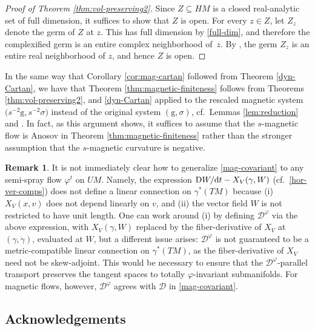 \documentclass[pdftex]{sigma}
\newcommand{\g}{\mathrm{g}}
\numberwithin{equation}{section}
\theoremstyle{definition}
\newtheorem{rem}[Theorem]{Remark}
\begin{document}
\begin{proof}[Proof of Theorem \ref{thm:vol-preserving2}]
Since $Z \subseteq HM$ is a closed real-analytic set of full dimension, it suffices to show that $Z$ is open. For every $z \in Z$, let $Z_z$ denote the germ of $Z$ at $z$. This has full dimension by \eqref{full-dim}, and therefore the complexified germ is an entire complex neighborhood of~$z$. By \cite[Chapter V, Proposition 1]{narasimhan2006introduction}, the germ $Z_z$ is an entire real neighborhood of $z$, and hence $Z$ is open.
\end{proof}

In the same way that Corollary \ref{cor:mag-cartan} followed from Theorem \ref{dyn-Cartan}, we have that Theorem \ref{thm:magnetic-finiteness} follows from Theorems \ref{thm:vol-preserving2}, and \ref{dyn-Cartan} applied to the rescaled magnetic system $\bigl(s^{-2}\g,s^{-2}\sigma\bigr)$ instead of the original system $(\g,\sigma)$, cf.\ Lemmas \ref{lem:reduction} and \cite{Paternains-94-convex}. In fact, as this argument shows, it suffices to assume that the \mbox{$s$-mag\-ne\-tic} flow is Anosov in Theorem \ref{thm:magnetic-finiteness} rather than the stronger assumption that the $s$-magnetic curvature is negative.

\begin{rem}\label{bugs}
 It is not immediately clear how to generalize \eqref{mag-covariant} to any semi-spray flow $\varphi^t$ on $UM$. Namely, the expression ${\rm D}W/{\rm d}t - X_V(\gamma, W)$ (cf.\ \eqref{hor-ver-comps}) does not define a linear connection on $\gamma^*(TM)$ because (i) $X_V(x,v)$ does not depend linearly on $v$, and (ii) the vector field $W$ is not restricted to have unit length. One can work around (i) by defining $\mathcal{D}^\varphi$ via the above expression, with $X_V(\gamma,W)$ replaced by the fiber-derivative of $X_V$ at $(\gamma,\dot{\gamma})$, evaluated at $W$, but a different issue arises: $\mathcal{D}^\varphi$ is not guaranteed to be a metric-compatible linear connection on $\gamma^*(TM)$, as the fiber-derivative of $X_V$ need not be skew-adjoint. This would be necessary to ensure that the $\mathcal{D}^\varphi$-parallel transport preserves the tangent spaces to totally $\varphi$-invariant submanifolds. For magnetic flows, however, $\mathcal{D}^\varphi$ agrees with $\mathcal{D}$ in \eqref{mag-covariant}.
\end{rem}


\subsection*{Acknowledgements}
\end{document}
